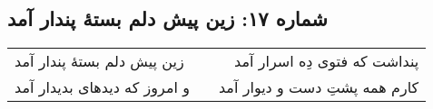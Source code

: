 \begin{center}
\section*{شماره ۱۷: زین پیش دلم بستۀ پندار آمد}
\label{sec:017}
\begin{longtable}{l p{0.5cm} r}
زین پیش دلم بستهٔ پندار آمد
&&
پنداشت که فتوی دِه اسرار آمد
\\
و امروز که دیدهای بدیدار آمد
&&
کارم همه پشتِ دست و دیوار آمد
\\
\end{longtable}
\end{center}
